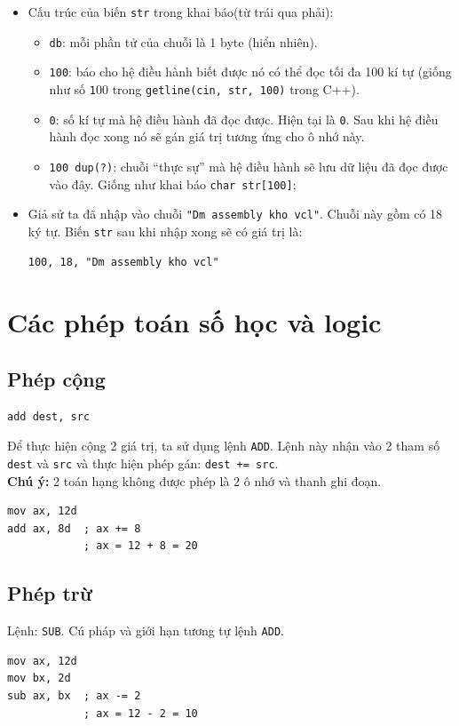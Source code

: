 \documentclass[12pt]{report}
\newcommand{\code}[1]{\texttt{#1}}
\begin{document}
\begin{itemize}
    \item Cấu trúc của biến \code{str} trong khai báo(từ trái qua phải):
    \begin{itemize}
        \item \code{db}: mỗi phần tử của chuỗi là 1 byte (hiển nhiên).
        \item \code{100}: báo cho hệ điều hành biết được nó có thể đọc tối đa 100 kí tự (giống như số \code 100 trong \code{getline(cin, str, 100)} trong C++).
        \item \code{0}: số kí tự mà hệ điều hành đã đọc được. Hiện tại là \code 0. Sau khi hệ điều hành đọc xong nó sẽ gán giá trị tương ứng cho ô nhớ này.
        \item \code{100 dup(?)}: chuỗi ``thực sự'' mà hệ điều hành sẽ lưu dữ liệu đã đọc được vào đây. Giống như khai báo \code{char str[100]};
    \end{itemize}
    \item Giả sử ta đã nhập vào chuỗi \code{"Dm assembly kho vcl"}. Chuỗi này gồm có 18 ký tự. Biến \code{str} sau khi nhập xong sẽ có giá trị là:
    \begin{verbatim}
100, 18, "Dm assembly kho vcl"
    \end{verbatim} 
\end{itemize}

\section{Các phép toán số học và logic}
\subsection{Phép cộng}
\begin{verbatim}
add dest, src
\end{verbatim}
Để thực hiện cộng 2 giá trị, ta sử dụng lệnh \code{ADD}. Lệnh này nhận vào 2 tham số \code{dest} và \code{src} và thực hiện phép gán: \code{dest += src}.\\
\textbf{Chú ý:} 2 toán hạng không được phép là 2 ô nhớ và thanh ghi đoạn.
\begin{verbatim}
mov ax, 12d 
add ax, 8d  ; ax += 8
            ; ax = 12 + 8 = 20 
\end{verbatim}

\subsection{Phép trừ}
Lệnh: \code{SUB}. Cú pháp và giới hạn tương tự lệnh \code{ADD}.
\begin{verbatim}
mov ax, 12d 
mov bx, 2d
sub ax, bx  ; ax -= 2
            ; ax = 12 - 2 = 10 
\end{verbatim}
\end{document}
